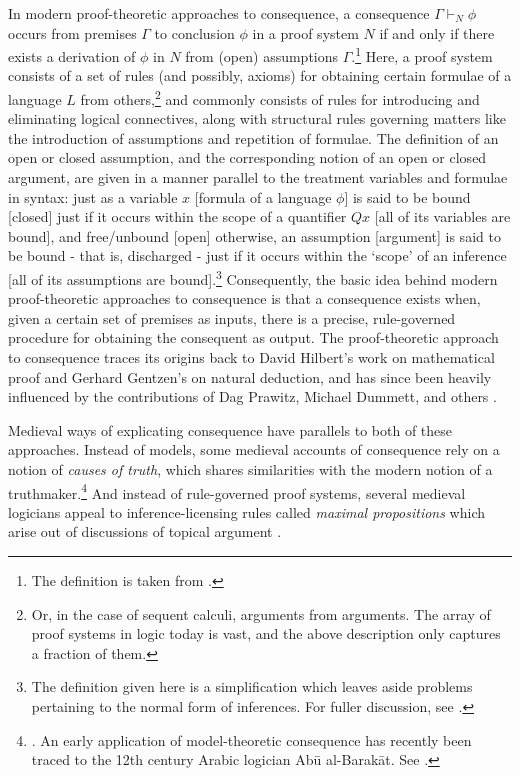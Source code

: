 \documentclass[]{article}
\begin{document}
In modern proof-theoretic approaches to consequence, a consequence $\Gamma \vdash_{N} \phi$ occurs from premises $\Gamma$ to conclusion $\phi$ in a proof system $N$ if and only if there exists a derivation of $\phi$ in $N$ from (open) assumptions $\Gamma$.\footnote{The definition is taken from \autocite[152]{Francez2017}.} Here, a proof system consists of a set of rules (and possibly, axioms) for obtaining certain formulae of a language $L$ from others,\footnote{Or, in the case of sequent calculi, arguments from arguments. The array of proof systems in logic today is vast, and the above description only captures a fraction of them.} and commonly consists of rules for introducing and eliminating logical connectives, along with structural rules governing matters like the introduction of assumptions and repetition of formulae. The definition of an open or closed assumption, and the corresponding notion of an open or closed argument, are given in a manner parallel to the treatment variables and formulae in syntax: just as a variable $x$ [formula of a language $\phi$] is said to be bound [closed] just if it occurs within the scope of a quantifier $Qx$ [all of its variables are bound], and free/unbound [open] otherwise, an assumption [argument] is said to be bound - that is, discharged - just if it occurs within the `scope' of an inference [all of its assumptions are bound].\footnote{The definition given here is a simplification which leaves aside problems pertaining to the normal form of inferences. For fuller discussion, see \cite{Prawitz1985}.} Consequently, the basic idea behind modern proof-theoretic approaches to consequence is that a consequence exists when, given a certain set of premises as inputs, there is a precise, rule-governed procedure for obtaining the consequent as output. The proof-theoretic approach to consequence traces its origins back to David Hilbert's work on mathematical proof and Gerhard Gentzen's on natural deduction, and has since been heavily influenced by the contributions of Dag Prawitz, Michael Dummett, and others \autocite{Gentzen1934,Prawitz1974,Dummett1991,Schroeder-Heister2006,Franks2010}.

Medieval ways of explicating consequence have parallels to both of these approaches. Instead of models, some medieval accounts of consequence rely on a notion of \textit{causes of truth}, which shares similarities with the modern notion of a truthmaker.\footnote{\autocite[I. c. 2, pp. 19-20]{BuridanTC}. An early application of model-theoretic consequence has recently been traced to the 12th century Arabic logician Ab\={u} al-Barak\={a}t. See \autocite{Hodges2018}.} And instead of rule-governed proof systems, several medieval logicians appeal to inference-licensing rules called \textit{maximal propositions} which arise out of discussions of topical argument \autocite[p. 76.5-7]{BurleyDPAL}. 
\end{document}
